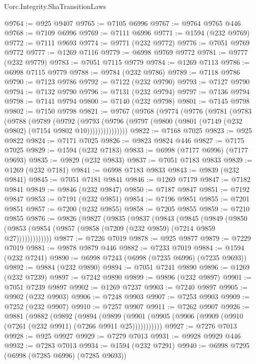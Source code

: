 \begin{lexlean}{Uorc.Integrity.ShaTransitionLaws}
\begin{coremodule}
@9764 := @925 @9407
@9765 := @7105 @6996
@9767 := @9764 @9765 @446
@9768 := @7109 @6996
@9769 := @7111 @6996
@9771 := @1594 (@232 @9769)
@9772 := @7111 @9693
@9774 := @9771 (@232 @9772)
@9776 := @7051 @9769 @9772
@9777 := @1269 @7116
@9779 := @6998 @9769 @9772
@9781 := @9777 (@232 @9779)
@9783 := @7051 @7115 @9779
@9784 := @1269 @7113
@9786 := @6998 @7115 @9779
@9788 := @9784 (@232 @9786)
@9789 := @7118 @9786
@9790 := @7123 @9786
@9792 := @7122 (@232 @9790)
@9793 := @7127 @9790
@9794 := @7132 @9790
@9796 := @7131 (@232 @9794)
@9797 := @7136 @9794
@9798 := @7141 @9794
@9800 := @7140 (@232 @9798)
@9801 := @7145 @9798
@9802 := @7150 @9798
@9821 := @9767
    (@9768
      (@9774
        (@9776
          (@9781
            (@9783
              (@9788
                (@9789
                  (@9792
                    (@9793
                      (@9796
                        (@9797 (@9800 (@9801 (@7149 (@232 @9802) (@7154 @9802 @10)))))))))))))))
@9822 := @7168 @7025
@9823 := @925 @9822
@9824 := @7171 @7025
@9826 := @9823 @9824 @446
@9827 := @7175 @7025
@9829 := @1594 (@232 @7183)
@9833 := @6998 (@7177 @6996) (@7177 @9693)
@9835 := @9829 (@232 @9833)
@9837 := @7051 @7183 @9833
@9839 := @1269 (@232 @7181)
@9841 := @6998 @7183 @9833
@9843 := @9839 (@232 @9841)
@9845 := @7051 @7181 @9841
@9846 := @1269 @7179
@9847 := @7182 @9841
@9849 := @9846 (@232 @9847)
@9850 := @7187 @9847
@9851 := @7192 @9847
@9853 := @7191 (@232 @9851)
@9854 := @7196 @9851
@9855 := @7201 @9851
@9857 := @7200 (@232 @9855)
@9858 := @7205 @9855
@9859 := @7210 @9855
@9876 := @9826
    (@9827
      (@9835
        (@9837
          (@9843
            (@9845
              (@9849
                (@9850 (@9853 (@9854 (@9857 (@9858 (@7209 (@232 @9859) (@7214 @9859 @27)))))))))))))
@9877 := @7226 @7019
@9878 := @925 @9877
@9879 := @7229 @7019
@9881 := @9878 @9879 @446
@9882 := @7233 @7019
@9884 := @1594 (@232 @7241)
@9890 := @6998 @7243 (@6998 (@7235 @6996) (@7235 @9693))
@9892 := @9884 (@232 @9890)
@9894 := @7051 @7241 @9890
@9896 := @1269 (@232 @7239)
@9897 := @7242 @9890
@9899 := @9896 (@232 @9897)
@9901 := @7051 @7239 @9897
@9902 := @1269 @7237
@9903 := @7240 @9897
@9905 := @9902 (@232 @9903)
@9906 := @7248 @9903
@9907 := @7253 @9903
@9909 := @7252 (@232 @9907)
@9910 := @7257 @9907
@9911 := @7262 @9907
@9926 := @9881
    (@9882
      (@9892
        (@9894
          (@9899 (@9901 (@9905 (@9906 (@9909 (@9910 (@7261 (@232 @9911) (@7266 @9911 @25)))))))))))
@9927 := @7276 @7013
@9928 := @925 @9927
@9929 := @7279 @7013
@9931 := @9928 @9929 @446
@9932 := @7283 @7013
@9934 := @1594 (@232 @7291)
@9940 := @6998 @7295 (@6998 (@7285 @6996) (@7285 @9693))

\end{coremodule}
\end{lexlean}
